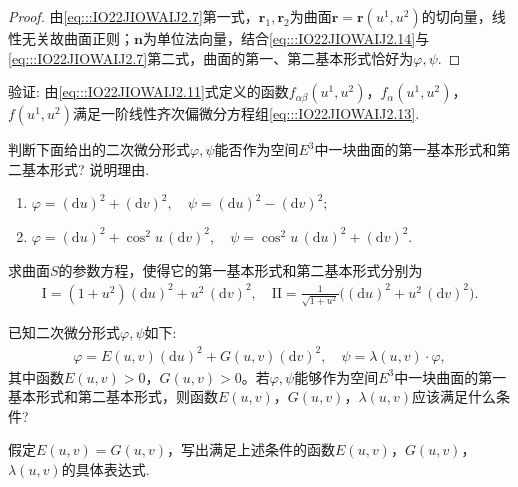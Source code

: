 \documentclass[../../main.tex]{subfiles}%
\begin{document}
\begin{proof}
由\eqref{eq:::IO22JIOWAIJ2.7}第一式，$\boldsymbol{r}_1,\boldsymbol{r}_2$为曲面$\boldsymbol{r}=\boldsymbol{r}(u^1,u^2)$的切向量，线性无关故曲面正则；$\boldsymbol{n}$为单位法向量，结合\eqref{eq:::IO22JIOWAIJ2.14}与\eqref{eq:::IO22JIOWAIJ2.7}第二式，曲面的第一、第二基本形式恰好为$\varphi,\psi$.
\end{proof}

\begin{example}
验证: 由\eqref{eq:::IO22JIOWAIJ2.11}式定义的函数$f_{\alpha\beta}(u^1,u^2)$，$f_\alpha(u^1,u^2)$，$f(u^1,u^2)$满足一阶线性齐次偏微分方程组\eqref{eq:::IO22JIOWAIJ2.13}.
\end{example}

\begin{example}
判断下面给出的二次微分形式$\varphi,\psi$能否作为空间$E^3$中一块曲面的第一基本形式和第二基本形式? 说明理由.
\begin{enumerate}[(1)]
\item $\varphi=(\mathrm{d}u)^2+(\mathrm{d}v)^2,\quad \psi=(\mathrm{d}u)^2-(\mathrm{d}v)^2;$
\item $\varphi=(\mathrm{d}u)^2+\cos^2 u\,(\mathrm{d}v)^2,\quad \psi=\cos^2 u\,(\mathrm{d}u)^2+(\mathrm{d}v)^2.$
\end{enumerate}
\end{example}

\begin{example}
求曲面$S$的参数方程，使得它的第一基本形式和第二基本形式分别为
\begin{align*}
\mathrm{I}=(1+u^2)(\mathrm{d}u)^2+u^2\,(\mathrm{d}v)^2,\quad \mathrm{II}=\frac{1}{\sqrt{1+u^2}}\big((\mathrm{d}u)^2+u^2\,(\mathrm{d}v)^2\big).
\end{align*}
\end{example}

\begin{example}
已知二次微分形式$\varphi,\psi$如下:
\begin{align*}
\varphi=E(u,v)(\mathrm{d}u)^2+G(u,v)(\mathrm{d}v)^2,\quad \psi=\lambda(u,v)\cdot\varphi,
\end{align*}
其中函数$E(u,v)>0$，$G(u,v)>0$。若$\varphi,\psi$能够作为空间$E^3$中一块曲面的第一基本形式和第二基本形式，则函数$E(u,v)$，$G(u,v)$，$\lambda(u,v)$应该满足什么条件?

假定$E(u,v)=G(u,v)$，写出满足上述条件的函数$E(u,v)$，$G(u,v)$，$\lambda(u,v)$的具体表达式.
\end{example}
\end{document}

